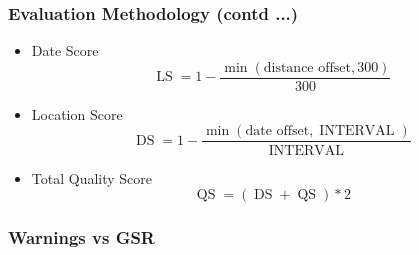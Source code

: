 \documentclass[red]{beamer}
\begin{document}
\begin{frame}
    \frametitle{Evaluation Methodology (contd ...)}
    \begin{itemize}
        \item
            Date Score
            \begin{equation*}
                \operatorname{LS}=1 - \frac{\min(\textrm{distance offset}, 300)}{300}
            \end{equation*}
        \item
            Location Score
            \begin{equation*}
                \operatorname{DS}=1 - \frac{\min(\textrm{date offset}, \operatorname{INTERVAL})}{\operatorname{INTERVAL}}
            \end{equation*}

        \item
            Total Quality Score
            \begin{equation*}
                \operatorname{QS}=(\operatorname{DS} + \operatorname{QS})*2
            \end{equation*}
    \end{itemize}

\end{frame}

\begin{frame}
    \frametitle{Warnings vs GSR}
    \begin{figure}%
    \centering
    \qquad
    \end{figure}
\end{frame}
\end{document}
